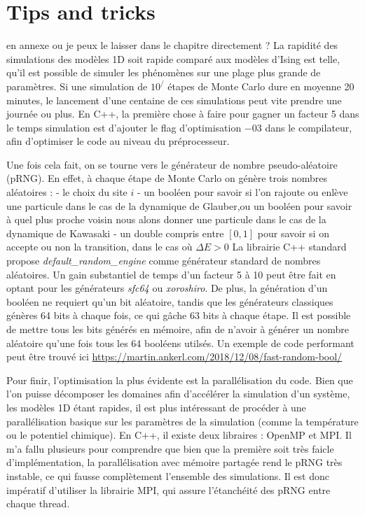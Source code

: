     \section{Tips and tricks}
    {\color{red} en annexe ou je peux le laisser dans le chapitre directement ? }
    La rapidité des simulations des modèles 1D soit rapide comparé aux modèles d'Ising est telle, qu'il est possible de simuler les phénomènes sur une plage plus grande de paramètres. Si une simulation de $10^/$ étapes de Monte Carlo dure en moyenne 20 minutes, le lancement d'une centaine de ces simulations peut vite prendre une journée ou plus.
    En C++, la première chose à faire pour gagner un facteur 5 dans le temps simulation est d'ajouter le flag d'optimisation $-03$ dans le compilateur, afin d'optimiser le code au niveau du préprocesseur. 
    
    Une fois cela fait, on se tourne vers le générateur de nombre pseudo-aléatoire (pRNG). En effet, à chaque étape de Monte Carlo on génère trois nombres aléatoires : 
    - le choix du site $i$
    - un booléen pour savoir si l'on rajoute ou enlève une particule dans le cas de la dynamique de Glauber,ou  un booléen pour savoir à quel plus proche voisin nous alons donner une particule dans le cas de la dynamique de Kawasaki
    - un double compris entre $[0,1]$ pour savoir si on accepte ou non la transition, dans le cas où $\Delta E \greater 0$
	La librairie C++ standard propose \textit{default\_random\_engine} comme générateur standard de nombres aléatoires. Un gain substantiel de temps d'un facteur 5 à 10 peut être fait en optant pour les générateurs \textit{sfc64} ou \textit{xoroshiro}. De plus, la génération d'un booléen ne requiert qu'un bit aléatoire, tandis que les générateurs classiques génères 64 bits à chaque fois, ce qui gâche 63 bits à chaque étape. Il est possible de mettre tous les bits générés en mémoire, afin de n'avoir à générer un nombre aléatoire qu'une fois tous les 64 booléens utilsés. Un exemple de code performant peut être trouvé ici
	 \url{https://martin.ankerl.com/2018/12/08/fast-random-bool/} 

    Pour finir, l'optimisation la plus évidente est la parallélisation du code. Bien que l'on puisse décomposer les domaines afin d'accélérer la simulation d'un système, les modèles 1D étant rapides, il est plus intéressant de procéder à une parallélisation basique sur les paramètres de la simulation (comme la température ou le potentiel chimique). En C++, il existe deux libraires : OpenMP et MPI. Il m'a fallu plusieurs pour comprendre que bien que la première soit très faicle d'implémentation, la parallélisation avec mémoire partagée rend le pRNG très instable, ce qui fausse complètement l'ensemble des simulations. Il est donc impératif d'utiliser la librairie MPI, qui assure l'étanchéité des pRNG entre chaque thread.
		
